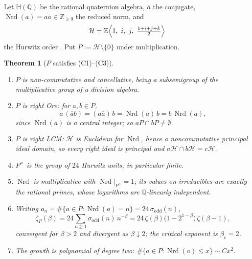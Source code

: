 \documentclass[11pt]{amsart}
\numberwithin{equation}{section}
\newtheorem{theorem}{Theorem}[section]
\theoremstyle{definition}
\theoremstyle{remark}
\newcommand{\Z}{\mathbb{Z}}
\newcommand{\Q}{\mathbb{Q}}
\newcommand{\HH}{\mathbb{H}}
\newcommand{\cH}{\mathcal{H}}
\newcommand{\Nrd}{\operatorname{Nrd}}
\begin{document}
Let $\HH(\Q)$ be the rational quaternion algebra, $\bar a$ the conjugate,
$\Nrd(a)=a\bar a\in\Z_{\ge0}$ the reduced norm, and
\[
\cH=\Z\Bigl\langle 1,\ i,\ j,\ \tfrac{1+i+j+k}{2}\Bigr\rangle
\]
the Hurwitz order \cite{Hurwitz,Reiner}. Put $P:=\cH\setminus\{0\}$ under multiplication.

\begin{theorem}[$P$ satisfies \textup{(C1)--(C3)}]\label{thm:hurwitz}
\begin{enumerate}
\item $P$ is non-commutative and cancellative, being a subsemigroup of the multiplicative
group of a division algebra.
\item $P$ is right Ore: for $a,b\in P$,
\[
a\,(\bar ab)=(a\bar a)\,b=\Nrd(a)\,b=b\,\Nrd(a),
\]
since $\Nrd(a)$ is a central integer; so $aP\cap bP\ne\emptyset$.
\item $P$ is right LCM: $\cH$ is Euclidean for $\Nrd$, hence a noncommutative principal ideal
domain, so every right ideal is principal and $a\cH\cap b\cH=c\cH$.
\item $P^\times$ is the group of $24$ Hurwitz units, in particular finite.
\item $\Nrd$ is multiplicative with $\Nrd|_{P^\times}=1$; its values on irreducibles are
exactly the rational primes, whose logarithms are $\Q$-linearly independent.
\item Writing $a_n=\#\{a\in P:\Nrd(a)=n\}=24\,\sigma_{\mathrm{odd}}(n)$,
\begin{equation}\label{eq:zeta}
\zeta_P(\beta)=24\sum_{n\ge1}\sigma_{\mathrm{odd}}(n)\,n^{-\beta}
=24\,\zeta(\beta)\bigl(1-2^{1-\beta}\bigr)\,\zeta(\beta-1),
\end{equation}
convergent for $\beta>2$ and divergent as $\beta\downarrow2$; the critical exponent is
$\beta_c=2$.
\item The growth is polynomial of degree two: $\#\{a\in P:\Nrd(a)\le x\}\sim Cx^2$.
\end{enumerate}
\end{theorem}
\end{document}
